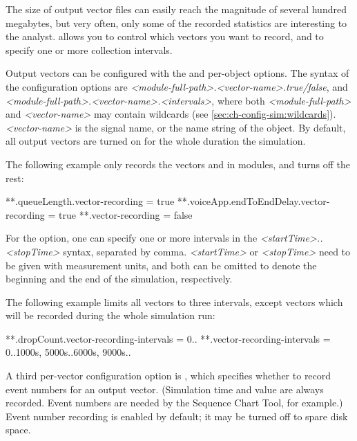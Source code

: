 The size of output vector files can easily reach the magnitude of several
hundred megabytes, but very often, only some of the recorded statistics are
interesting to the analyst. {\opp} allows you to control which vectors you
want to record, and to specify one or more collection intervals.

Output vectors can be configured with the  and
 per-object options. The syntax of the
configuration options are
\textit{<module-full-path>.<vector-name>.}\textit{true/false},
and \textit{<module-full-path>.<vector-name>.}\textit{<intervals>},
where both \textit{<module-full-path>} and \textit{<vector-name>} may
contain wildcards (see \ref{sec:ch-config-sim:wildcards}).
\textit{<vector-name>} is the signal name, or the name string of the
 object. By default, all output vectors are turned
on for the whole duration the simulation.

The following example only records the  vectors and
 in  modules, and turns off the rest:

\begin{inifile}
**.queueLength.vector-recording = true
**.voiceApp.endToEndDelay.vector-recording = true
**.vector-recording = false
\end{inifile}

For the  option, one can specify
one or more intervals in the \textit{<startTime>..<stopTime>} syntax,
separated by comma. \textit{<startTime>} or \textit{<stopTime>} need
to be given with measurement units, and both can be omitted to denote
the beginning and the end of the simulation, respectively.

The following example limits all vectors to three intervals, except
 vectors which will be recorded during the whole
simulation run:

\begin{inifile}
**.dropCount.vector-recording-intervals = 0..
**.vector-recording-intervals = 0..1000s, 5000s..6000s, 9000s..
\end{inifile}

A third per-vector configuration option is ,
which specifies whether to record event numbers for an output vector.
(Simulation time and value are always recorded. Event numbers are needed
by the Sequence Chart Tool, for example.) Event number recording is enabled
by default; it may be turned off to spare disk space.

